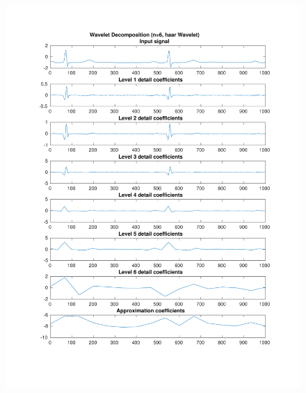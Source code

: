 \documentclass[11pt,a4paper]{article}
\begin{document}
\begin{figure}[H]
\centering
\begin{minipage}{0.48\textwidth}
	\centering
	\includegraphics[width=\textwidth]{fig/123l1_dwt1.pdf}
	

\end{minipage}
\end{figure}
\end{document}
